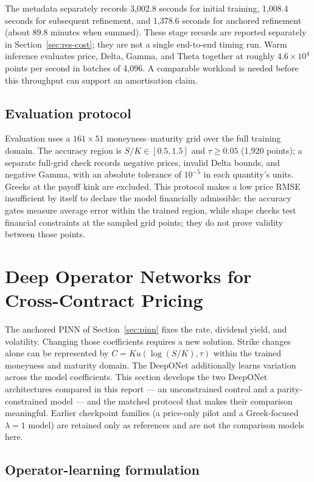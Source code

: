 \documentclass[11pt,a4paper]{article}
\begin{document}
The metadata separately records 3,002.8 seconds for initial training, 1,008.4 seconds for subsequent refinement, and 1,378.6 seconds for anchored refinement (about 89.8 minutes when summed). These stage records are reported separately in Section~\ref{sec:res-cost}; they are not a single end-to-end timing run. Warm inference evaluates price, Delta, Gamma, and Theta together at roughly $4.6\times10^4$ points per second in batches of 4,096. A comparable workload is needed before this throughput can support an amortisation claim.

\subsection{Evaluation protocol}
\label{sec:pinn-eval}

Evaluation uses a $161\times51$ moneyness--maturity grid over the full training domain. The accuracy region is $S/K\in[0.5,1.5]$ and $\tau\ge0.05$ (1,920 points); a separate full-grid check records negative prices, invalid Delta bounds, and negative Gamma, with an absolute tolerance of $10^{-5}$ in each quantity's units. Greeks at the payoff kink are excluded. This protocol makes a low price RMSE insufficient by itself to declare the model financially admissible: the accuracy gates measure average error within the trained region, while shape checks test financial constraints at the sampled grid points; they do not prove validity between those points.

\section{Deep Operator Networks for Cross-Contract Pricing}
\label{sec:deeponet}

The anchored PINN of Section~\ref{sec:pinn} fixes the rate, dividend yield, and volatility. Changing those coefficients requires a new solution. Strike changes alone can be represented by $C=K u(\log(S/K),\tau)$ within the trained moneyness and maturity domain. The DeepONet additionally learns variation across the model coefficients. This section develops the two DeepONet architectures compared in this report --- an unconstrained control and a parity-constrained model --- and the matched protocol that makes their comparison meaningful. Earlier checkpoint families (a price-only pilot and a Greek-focused $\lambda=1$ model) are retained only as references and are not the comparison models here.

\subsection{Operator-learning formulation}
\label{sec:deeponet-theory}
\end{document}
